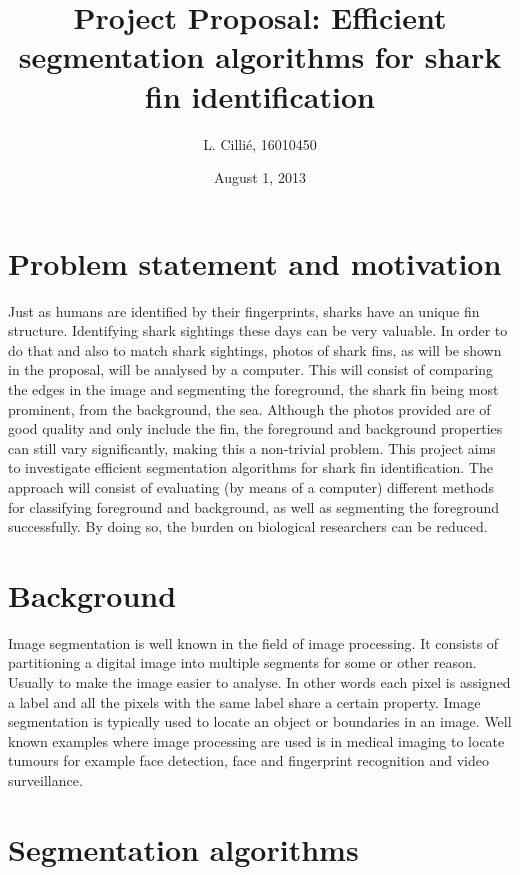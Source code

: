 \documentclass[a4paper,10pt]{article}
\title{Project Proposal: Efficient segmentation algorithms for shark fin identification}
\author{L. Cilli\'{e}, 16010450}
\date{August 1, 2013}
\begin{document}
\maketitle
\lstset{language=Matlab}

\newpage
\tableofcontents
\newpage

\section{Problem statement and motivation}  
Just as humans are identified by their fingerprints, sharks have an unique fin structure.  Identifying shark sightings these days can be very valuable.  In order to do that and also to match shark sightings, photos of shark fins, as will be shown in the proposal, will be analysed by a computer.  This will consist of comparing the edges in the image and segmenting the foreground, the shark fin being most prominent,  from the background, the sea.  Although the photos provided are of good quality and only include the fin, the foreground and background properties can still vary significantly, making this a non-trivial problem.  This project aims to investigate efficient segmentation algorithms for shark fin identification.  The approach will consist of evaluating (by means of a computer) different methods for classifying foreground and background, as well as segmenting the foreground successfully.  By doing so, the burden on biological researchers can be reduced. 


\section{Background}
Image segmentation is well known in the field of image processing.  It consists of partitioning a digital image into multiple segments for some or other reason.  Usually to make the image easier to analyse.  In other words each pixel is assigned a label and all the pixels with the same label share a certain property.  Image segmentation is typically used to locate an object or boundaries in an image.  Well known examples where image processing are used is in medical imaging to locate tumours for example face detection, face and fingerprint recognition and video surveillance.


\section{Segmentation algorithms}
\end{document}
